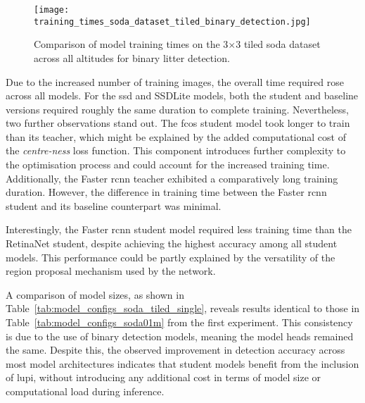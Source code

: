 \begin{figure}[!ht]
    \centering
    \texttt{[image: training\_times\_soda\_dataset\_tiled\_binary\_detection.jpg]}
    \caption{Comparison of model training times on the 3$\times$3 tiled \gls{soda} dataset across all altitudes for binary litter detection.}
    \label{fig:soda_tiled_single_training_time}
\end{figure}

Due to the increased number of training images, the overall time required rose across all models. For the \gls{ssd} and SSDLite models, both the student and baseline versions required roughly the same duration to complete training. Nevertheless, two further observations stand out. The \gls{fcos} student model took longer to train than its teacher, which might be explained by the added computational cost of the \textit{centre-ness} loss function. This component introduces further complexity to the optimisation process and could account for the increased training time. Additionally, the Faster \gls{rcnn} teacher exhibited a comparatively long training duration. However, the difference in training time between the Faster \gls{rcnn} student and its baseline counterpart was minimal.

Interestingly, the Faster \gls{rcnn} student model required less training time than the RetinaNet student, despite achieving the highest accuracy among all student models. This performance could be partly explained by the versatility of the region proposal mechanism used by the network.

A comparison of model sizes, as shown in Table~\ref{tab:model_configs_soda_tiled_single}, reveals results identical to those in Table~\ref{tab:model_configs_soda01m} from the first experiment. This consistency is due to the use of binary detection models, meaning the model heads remained the same. Despite this, the observed improvement in detection accuracy across most model architectures indicates that student models benefit from the inclusion of \gls{lupi}, without introducing any additional cost in terms of model size or computational load during inference.

